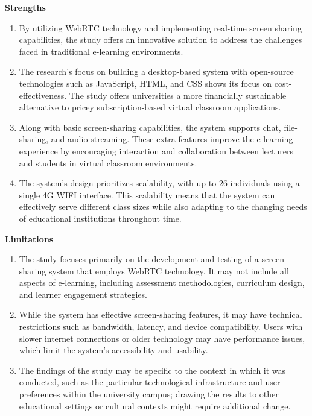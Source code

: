 \documentclass[a4paper,12pt]{article}  %
\begin{document}
\textbf{Strengths }\\
\begin{enumerate}
  \item By utilizing WebRTC technology and implementing real-time screen sharing
        capabilities, the study offers an innovative solution to address the challenges
        faced in traditional e-learning environments.\\
  \item The research's focus on building a desktop-based system with open-source
        technologies such as JavaScript, HTML, and CSS shows its focus on
        cost-effectiveness. The study offers universities a more financially
        sustainable alternative to pricey subscription-based virtual classroom
        applications.\\
  \item Along with basic screen-sharing capabilities, the system supports chat,
        file-sharing, and audio streaming. These extra features improve the e-learning
        experience by encouraging interaction and collaboration between lecturers and
        students in virtual classroom environments.\\
  \item The system's design prioritizes scalability, with up to 26 individuals using a
        single 4G WIFI interface. This scalability means that the system can
        effectively serve different class sizes while also adapting to the changing
        needs of educational institutions throughout time.\\
\end{enumerate}

\textbf{Limitations }\\
\begin{enumerate}
  \item The study focuses primarily on the development and testing of a screen-sharing
        system that employs WebRTC technology. It may not include all aspects of
        e-learning, including assessment methodologies, curriculum design, and learner
        engagement strategies.\\
  \item While the system has effective screen-sharing features, it may have technical
        restrictions such as bandwidth, latency, and device compatibility. Users with
        slower internet connections or older technology may have performance issues,
        which limit the system's accessibility and usability.\\
  \item The findings of the study may be specific to the context in which it was
        conducted, such as the particular technological infrastructure and user
        preferences within the university campus; drawing the results to other
        educational settings or cultural contexts might require additional change.\\
\end{enumerate}
\end{document}
